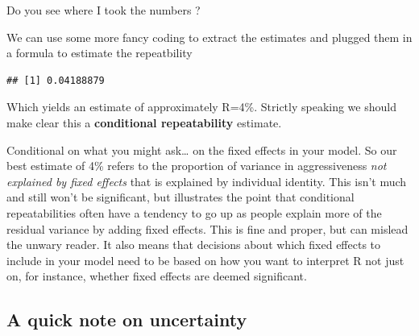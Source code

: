\documentclass[
  12pt,
]{book}
\makeatletter
\newenvironment{Shaded}{\begin{snugshade}}{\end{snugshade}}
\newcommand{\DecValTok}[1]{\textcolor[rgb]{0.00,0.00,0.81}{#1}}
\newcommand{\KeywordTok}[1]{\textcolor[rgb]{0.13,0.29,0.53}{\textbf{#1}}}
\newcommand{\NormalTok}[1]{#1}
\newcommand{\OperatorTok}[1]{\textcolor[rgb]{0.81,0.36,0.00}{\textbf{#1}}}
\newcommand{\StringTok}[1]{\textcolor[rgb]{0.31,0.60,0.02}{#1}}
\newenvironment{kframe}{%
\medskip{}
\setlength{\fboxsep}{.8em}
\def\at@end@of@kframe{}%
\ifinner\ifhmode%
 \def\at@end@of@kframe{\end{minipage}}%
 \begin{minipage}{\columnwidth}%
\fi\fi%
\def\FrameCommand##1{\hskip\@totalleftmargin \hskip-\fboxsep
\colorbox{incolor}{##1}\hskip-\fboxsep
    \hskip-\linewidth \hskip-\@totalleftmargin \hskip\columnwidth}%
\MakeFramed {\advance\hsize-\width
  \@totalleftmargin\z@ \linewidth\hsize
  \@setminipage}}%
{\par\unskip\endMakeFramed%
\at@end@of@kframe}
\newenvironment{rmdblock}[1]
 {
 \begin{itemize}
 \renewcommand{\labelitemi}{
   \raisebox{-.7\height}[0pt][0pt]{
     {\setkeys{Gin}{width=3em,keepaspectratio}\texttt{[image: images/icons/\#1]}}
   }
 }
 \begin{kframe}
 \setlength{\fboxsep}{1em}
 \item
 }
 {
 \end{kframe}
 \end{itemize}
 }
\newenvironment{rmdcode}
  {\begin{rmdblock}{code}}
  {\end{rmdblock}}
\makeatother
\begin{document}
\begin{rmdcode}
Do you see where I took the numbers ?
\end{rmdcode}

We can use some more fancy coding to extract the estimates and plugged them in a formula to estimate the repeatbility

\begin{Shaded}
\end{Shaded}

\begin{verbatim}
## [1] 0.04188879
\end{verbatim}

Which yields an estimate of approximately R=4\%. Strictly speaking we should make clear this a \textbf{conditional repeatability} estimate.

Conditional on what you might ask\ldots{} on the fixed effects in your model. So our best estimate of 4\% refers to the proportion of variance in aggressiveness \emph{not explained by fixed effects} that is explained by individual identity. This isn't much and still won't be significant, but illustrates the point that conditional repeatabilities often have a tendency to go up as people explain more of the residual variance by adding fixed effects. This is fine and proper, but can mislead the unwary reader.
It also means that decisions about which fixed effects to include in your model need to be based on how you want to interpret R not just on, for instance, whether fixed effects are deemed significant.

\hypertarget{a-quick-note-on-uncertainty}{%
\subsection{A quick note on uncertainty}\label{a-quick-note-on-uncertainty}}
\end{document}
